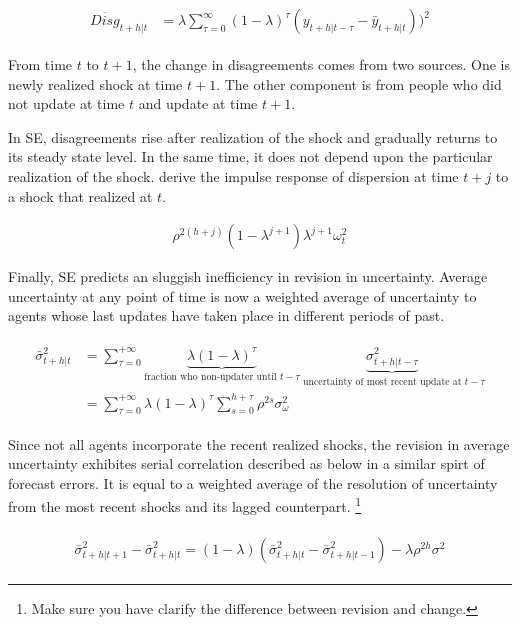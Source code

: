 \documentclass[]{article}
\begin{document}
\begin{eqnarray}
\begin{aligned}
\overline{Disg}_{t+h|t} & = \lambda \sum^{\infty}_{\tau=0} (1-\lambda)^{\tau} (y_{t+h|t-\tau} - \bar y_{t+h|t }))^2  
\end{aligned}
\end{eqnarray}

From time $t$ to $t+1$, the change in disagreements comes from two sources. One is newly realized shock at time $t+1$. The other component is from people who did not update at time $t$ and update at time $t+1$.  

In SE, disagreements rise after realization of the shock and gradually returns to its steady state level. In the same time, it does not depend upon the particular realization of the shock. \citet{coibion2012can} derive the impulse response of dispersion at time $t+j$ to a shock that realized at $t$. 

\begin{eqnarray}
\rho^{2(h+j)} (1-\lambda^{j+1})\lambda^{j+1} \omega^2_t
\end{eqnarray}

Finally, SE predicts an sluggish inefficiency in revision in uncertainty. Average uncertainty at any point of time is now a weighted average of uncertainty to agents whose last updates have taken place in different periods of past.  

\begin{eqnarray}
\begin{aligned}
\bar \sigma^2_{t+h|t} & = \sum^{+\infty}_{\tau =0} \underbrace{\lambda (1-\lambda)^\tau}_{\text{fraction who non-updater until }t-\tau} \underbrace{\sigma^2_{t+h|t-\tau}}_{\text{ uncertainty of most recent update at }t-\tau} \\
& = \sum^{+\infty}_{\tau =0} \lambda (1-\lambda)^\tau \sum^{h+\tau}_{s=0}\rho^{2s} \sigma^2_{\omega}
\end{aligned}
\end{eqnarray}

Since not all agents incorporate the recent realized shocks, the revision in average uncertainty exhibites serial correlation described as below in a similar spirt of forecast errors. It is equal to a weighted average of the resolution of uncertainty from the most recent shocks and its lagged counterpart. \footnote{Make sure you have clarify the difference between revision and change.}


\begin{eqnarray}
\begin{aligned}
\bar \sigma^2_{t+h|t+1} - \bar \sigma^2_{t+h|t} = (1-\lambda)(
\bar \sigma^2_{t+h|t} - \bar \sigma^2_{t+h|t-1}) -\lambda \rho^{2h} \sigma^2 
\end{aligned}
\end{eqnarray}
\end{document}

